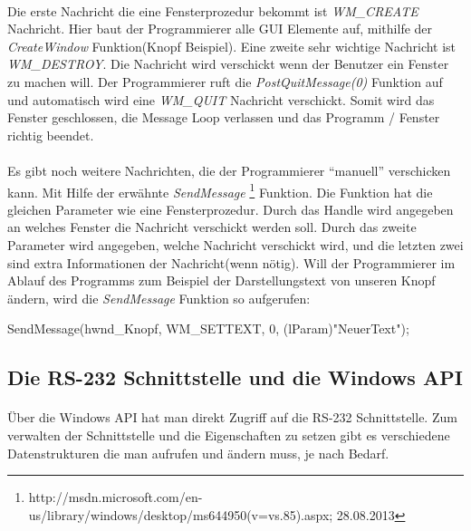 \paragraph{}
Die erste Nachricht die eine Fensterprozedur bekommt ist \textit{WM\_CREATE} Nachricht. Hier baut der Programmierer alle GUI Elemente auf, mithilfe der \textit{CreateWindow} Funktion(Knopf Beispiel). Eine zweite sehr wichtige Nachricht ist \textit{WM\_DESTROY}. Die Nachricht wird verschickt wenn der Benutzer ein Fenster zu machen will. Der Programmierer ruft die \textit{PostQuitMessage(0)} Funktion auf und automatisch wird eine \textit{WM\_QUIT} Nachricht verschickt. Somit wird das Fenster geschlossen, die Message Loop verlassen und das Programm / Fenster richtig beendet.

\paragraph{}
Es gibt noch weitere Nachrichten, die der Programmierer "`manuell"' verschicken kann. Mit Hilfe der erwähnte \textit{SendMessage} \footnote{http://msdn.microsoft.com/en-us/library/windows/desktop/ms644950(v=vs.85).aspx; 28.08.2013} Funktion. Die Funktion hat die gleichen Parameter wie eine Fensterprozedur. Durch das Handle wird angegeben an welches Fenster die Nachricht verschickt werden soll. Durch das zweite Parameter wird angegeben, welche Nachricht verschickt wird, und die letzten zwei sind extra Informationen der Nachricht(wenn nötig). Will der Programmierer im Ablauf des Programms zum Beispiel der Darstellungstext von unseren Knopf ändern, wird die \textit{SendMessage} Funktion so aufgerufen:

\begin{center}
SendMessage(hwnd\_Knopf, WM\_SETTEXT, 0, (lParam)"NeuerText");
\end{center}

\subsection{Die RS-232 Schnittstelle und die Windows API}
\paragraph{}
Über die Windows API hat man direkt Zugriff auf die RS-232 Schnittstelle. Zum verwalten der Schnittstelle und die Eigenschaften zu setzen gibt es verschiedene Datenstrukturen die man aufrufen und ändern muss, je nach Bedarf.


